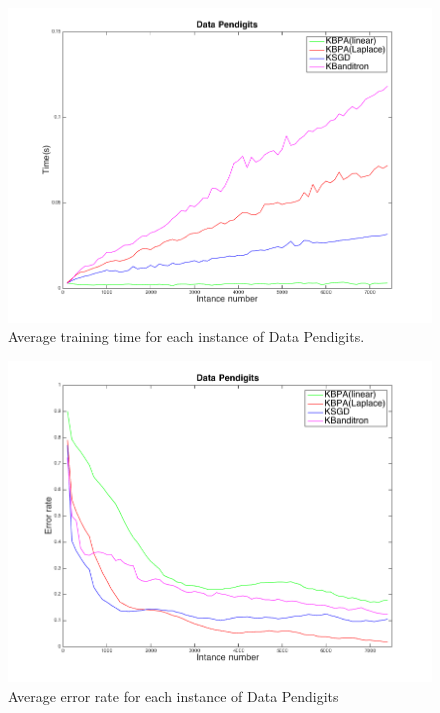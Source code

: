 \documentclass[twocolumn]{article}
\begin{document}
\begin{figure}[h!]
	\includegraphics[width=\linewidth]{figs/Pendigits_kernel_T.png}
	\caption{Average training time for each instance of Data Pendigits.}
	\label{pic:PKT}
\end{figure}

\begin{figure}[h!]
	\centerline{
		\includegraphics[width=\linewidth]{figs/Pendigits_kernel_M.png}}
	\caption{Average error rate for each instance of Data Pendigits}
	\label{pic:PKM}
\end{figure}
\end{document}
